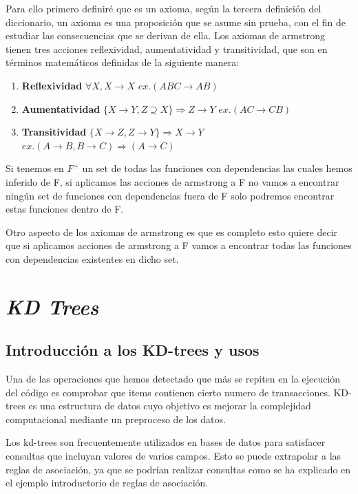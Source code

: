 \documentclass{cosas/tfg_domingo}
\begin{document}
Para ello primero definiré que es un axioma, según la tercera definición del diccionario, un axioma es una proposición que se asume sin prueba, con el fin de estudiar las consecuencias que se derivan de ella. Los axiomas de armstrong tienen tres acciones reflexividad, aumentatividad y transitividad, que son en términos matemáticos definidas de la siguiente manera:

\begin{enumerate}
    \item \textbf{Reflexividad} $\forall X , X \rightarrow X $ $ex. (ABC \rightarrow AB)$
    
    \item \textbf{Aumentatividad} $\{ X \rightarrow Y , Z \supseteq X \} \Rightarrow Z \rightarrow Y  $ $ex. (AC \rightarrow CB)$
    
    \item \textbf{Transitividad} $ \{ X\rightarrow Z , Z \rightarrow Y \} \Rightarrow X \rightarrow Y $ $ex. (A \rightarrow B , B \rightarrow C) \Rightarrow (A \rightarrow C)$
\end{enumerate}

Si tenemos en $F^+$ un set de todas las funciones con dependencias las cuales hemos inferido de F, si aplicamos las acciones de armstrong a F no vamos a encontrar ningún set de funciones con dependencias fuera de F solo podremos encontrar estas funciones dentro de F.

Otro aspecto de los axiomas de armstrong es que es completo esto quiere decir que si aplicamos acciones de armstrong a F vamos a encontrar todas las funciones con dependencias existentes en dicho set.




\chapter{\emph{KD Trees}}

\section{Introducción a los KD-trees y usos}
Una de las operaciones que hemos detectado que más se repiten en la ejecución del código es comprobar que items contienen cierto numero de transacciones. KD-trees es una estructura de datos cuyo objetivo es mejorar la complejidad computacional mediante un preproceso de los datos.

Los kd-trees son frecuentemente utilizados en bases de datos para satisfacer consultas que incluyan valores de varios campos. Esto se puede extrapolar a las reglas de asociación, ya que se podrían realizar consultas como se ha explicado en el ejemplo introductorio de reglas de asociación.
\end{document}
